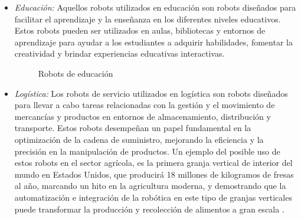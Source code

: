 \begin{itemize}
 
 \item \textit{Educación:} Aquellos robots utilizados en educación son robots diseñados para facilitar el aprendizaje y la enseñanza en los diferentes niveles educativos. Estos robots pueden ser utilizados en aulas, bibliotecas y entornos de aprendizaje para ayudar a los estudiantes a adquirir habilidades, fomentar la creatividad y brindar experiencias educativas interactivas.\\
 
 \begin{figure}[H]
    \begin{center}
      \subcapcentertrue
      \hspace{2mm}
    \end{center}
    \caption{Robots de educación}
    \label{fig:Robots de educación}
  \end{figure}
 
 \item \textit{Logística:} Los robots de servicio utilizados en logística son robots diseñados para llevar a cabo tareas relacionadas con la gestión y el movimiento de mercancías y productos en entornos de almacenamiento, distribución y transporte. Estos robots desempeñan un papel fundamental en la optimización de la cadena de suministro, mejorando la eficiencia y la precisión en la manipulación de productos. Un ejemplo del posible uso de estos robots en el sector agrícola, es la primera granja vertical de interior del mundo en Estados Unidos, que producirá 18 millones de kilogramos de fresas al año, marcando un hito en la agricultura moderna, y demostrando que la automatización e integración de la robótica en este tipo de granjas verticales puede transformar la producción y recolección de alimentos a gran escala \cite{EcoInventos24}.
 

\end{itemize}
